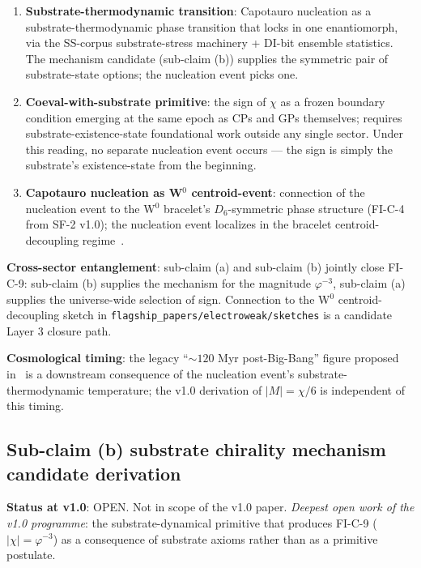 \documentclass[11pt,letterpaper]{article}
\newcommand{\phig}{\varphi}
\begin{document}
\begin{enumerate}\setlength\itemsep{0.2em}
    \item \textbf{Substrate-thermodynamic transition}: Capotauro nucleation as a substrate-thermodynamic phase transition that locks in one enantiomorph, via the SS-corpus substrate-stress machinery + DI-bit ensemble statistics. The mechanism candidate (sub-claim (b)) supplies the symmetric pair of substrate-state options; the nucleation event picks one.
    \item \textbf{Coeval-with-substrate primitive}: the sign of $\chi$ as a frozen boundary condition emerging at the same epoch as CPs and GPs themselves; requires substrate-existence-state foundational work outside any single sector. Under this reading, no separate nucleation event occurs --- the sign is simply the substrate's existence-state from the beginning.
    \item \textbf{Capotauro nucleation as W$^0$ centroid-event}: connection of the nucleation event to the W$^0$ bracelet's $D_6$-symmetric phase structure (FI-C-4 from SF-2 v1.0); the nucleation event localizes in the bracelet centroid-decoupling regime~\cite{abshier_capotauro_closure_sketch}.
\end{enumerate}

\textbf{Cross-sector entanglement}: sub-claim (a) and sub-claim (b) jointly close FI-C-9: sub-claim (b) supplies the mechanism for the magnitude $\phig^{-3}$, sub-claim (a) supplies the universe-wide selection of sign. Connection to the W$^0$ centroid-decoupling sketch in \texttt{flagship\_papers/electroweak/sketches} is a candidate Layer 3 closure path.

\textbf{Cosmological timing}: the legacy ``$\sim 120$ Myr post-Big-Bang'' figure proposed in~\cite{abshier_grok_capotauro_2025} is a downstream consequence of the nucleation event's substrate-thermodynamic temperature; the v1.0 derivation of $|M| = \chi/6$ is independent of this timing.

\subsection{Sub-claim (b) substrate chirality mechanism candidate derivation}\label{sec:open_subclaim_b}

\textbf{Status at v1.0}: OPEN. Not in scope of the v1.0 paper. \emph{Deepest open work of the v1.0 programme}: the substrate-dynamical primitive that produces FI-C-9 ($|\chi| = \phig^{-3}$) as a consequence of substrate axioms rather than as a primitive postulate.
\end{document}
